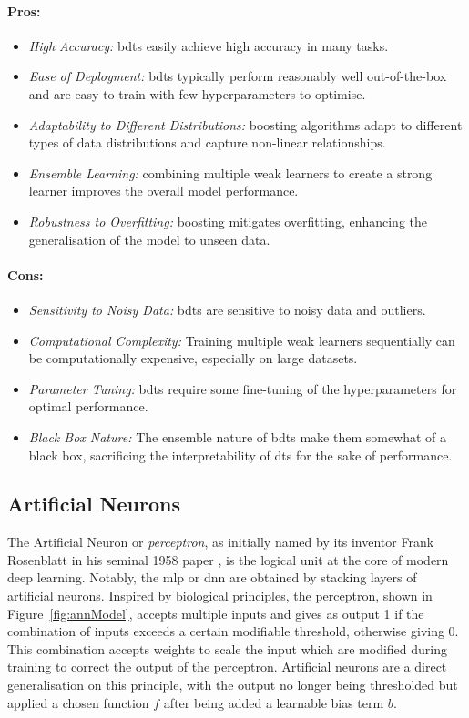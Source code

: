 \paragraph{Pros:}
\begin{itemize}
    \item \textit{High Accuracy:} \glspl{bdt} easily achieve high accuracy in many tasks.
    \item \textit{Ease of Deployment:} \glspl{bdt} typically perform reasonably well out-of-the-box and are easy to train with few hyperparameters to optimise. 
    \item \textit{Adaptability to Different Distributions:} boosting algorithms adapt to different types of data distributions and capture non-linear relationships.
    \item \textit{Ensemble Learning:} combining multiple weak learners to create a strong learner improves the overall model performance. 
    \item \textit{Robustness to Overfitting:} boosting mitigates overfitting, enhancing the generalisation of the model to unseen data. 
\end{itemize}

\paragraph{Cons:}
\begin{itemize}
    \item \textit{Sensitivity to Noisy Data:} \glspl{bdt} are sensitive to noisy data and outliers.
    \item \textit{Computational Complexity:} Training multiple weak learners sequentially can be computationally expensive, especially on large datasets.
    \item \textit{Parameter Tuning:} \glspl{bdt} require some fine-tuning of the hyperparameters for optimal performance.
    \item \textit{Black Box Nature:} The ensemble nature of \glspl{bdt} make them somewhat of a black box, sacrificing the interpretability of \glspl{dt} for the sake of performance.
\end{itemize}

\subsection{Artificial Neurons}
The Artificial Neuron or \textit{perceptron}, as initially named by its inventor Frank Rosenblatt in his seminal 1958 paper \cite{rosenblatt1958perceptron}, is the logical unit at the core of modern deep learning. Notably, the \gls{mlp} or \gls{dnn} are obtained by stacking layers of artificial neurons. Inspired by biological principles, the perceptron, shown in Figure~\ref{fig:annModel}, accepts multiple inputs and gives as output 1 if the combination of inputs exceeds a certain modifiable threshold, otherwise giving 0. This combination accepts weights to scale the input which are modified during training to correct the output of the perceptron. Artificial neurons are a direct generalisation on this principle, with the output no longer being thresholded but applied a chosen function $f$ after being added a learnable bias term $b$. 

